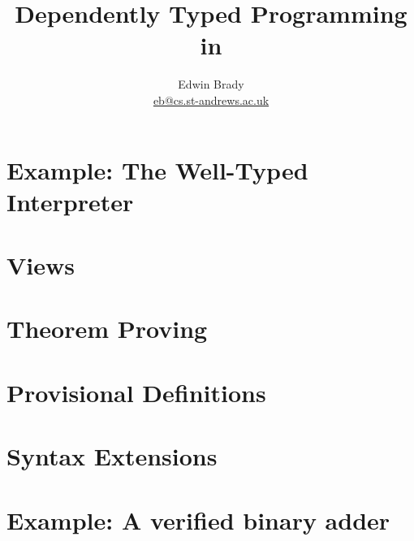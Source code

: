 \documentclass{article}
\title{Dependently Typed Programming in \Idris{}}
\author{Edwin Brady \\ \url{eb@cs.st-andrews.ac.uk}}
\begin{document}
\maketitle








\section{Example: The Well-Typed Interpreter}
\section{Views}
\section{Theorem Proving}
\section{Provisional Definitions}
\section{Syntax Extensions}
\section{Example: A verified binary adder}





\end{document}
